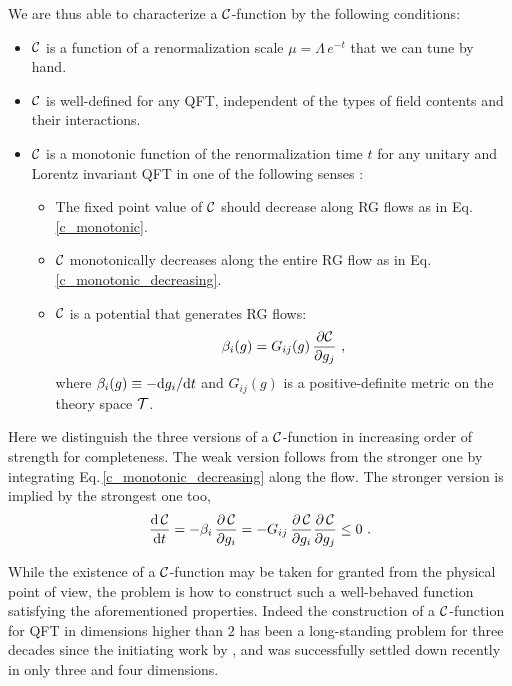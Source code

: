 We are thus able to characterize a ${\cal C}$-function by the following conditions:
\begin{itemize}
\item ${\cal C}$ is a function of a renormalization scale $\mu = \Lambda\, e^{-t}$ that we can tune by hand.
\item ${\cal C}$ is well-defined for any QFT, independent of the types of field contents and their interactions.
\item ${\cal C}$ is a monotonic function of the renormalization time $t$ for any unitary and Lorentz invariant QFT in one of the following senses \cite{Barnes:2004jj,Gukov:2015qea}:
	\begin{itemize}
	\item[(i)] [Weak version] The fixed point value of ${\cal C}$ should decrease along RG flows as in Eq.\, \eqref{c_monotonic}.
	\item[(ii)] [Stronger version] ${\cal C}$ monotonically decreases along the entire RG flow as in Eq.\,\eqref{c_monotonic_decreasing}.
	\item[(iii)] [Strongest version] ${\cal C}$ is a potential that generates RG flows:
		\begin{align}
			\beta_i (g) = G_{ij}(g)\,\frac{\partial \CC}{\partial g_j} \ ,
		\end{align}
		where $\beta_i (g) \equiv - \mathrm{d} g_i /\mathrm{d} t$ and $G_{ij}(g)$ is a positive-definite metric on the theory space ${\cal T}$.
	\end{itemize}
\end{itemize}
Here we distinguish the three versions of a ${\cal C}$-function in increasing order of strength for completeness.
The weak version follows from the stronger one by integrating Eq.\,\eqref{c_monotonic_decreasing} along the flow.
The stronger version is implied by the strongest one too,
\begin{align}
	\frac{\mathrm{d}\,{\cal C}}{\mathrm{d} t} = - \beta_i \,\frac{\partial\,{\cal C}}{\partial g_i} = - G_{ij}\,\frac{\partial\,{\cal C}}{\partial g_i} \frac{\partial\,{\cal C}}{\partial g_j}  \le 0 \ .
\end{align}


While the existence of a ${\cal C}$-function may be taken for granted from the physical point of view, the problem is how to construct such a well-behaved function satisfying the aforementioned properties.
Indeed the construction of a ${\cal C}$-function for QFT in dimensions higher than $2$ has been a long-standing problem for three decades since the initiating work by \textcite{Zamolodchikov:1986gt}, and was successfully settled down recently in only three and four dimensions.

